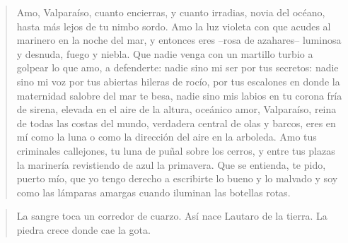 \documentclass[12pt]{article}
\begin{document}
\clearpage
{}
\begin{verse}
Amo, Valparaíso, cuanto encierras,  
y cuanto irradias, novia del océano,  
hasta más lejos de tu nimbo sordo.  
Amo la luz violeta con que acudes  
al marinero en la noche del mar,  
y entonces eres --rosa de azahares--  
luminosa y desnuda, fuego y niebla.  
Que nadie venga con un martillo turbio  
a golpear lo que amo, a defenderte:  
nadie sino mi ser por tus secretos:  
nadie sino mi voz por tus abiertas  
hileras de rocío, por tus escalones  
en donde la maternidad salobre  
del mar te besa, nadie sino mis labios  
en tu corona fría de sirena,  
elevada en el aire de la altura,  
oceánico amor, Valparaíso,  
reina de todas las costas del mundo,  
verdadera central de olas y barcos,  
eres en mí como la luna o como  
la dirección del aire en la arboleda.  
Amo tus criminales callejones,  
tu luna de puñal sobre los cerros,  
y entre tus plazas la marinería  
revistiendo de azul la primavera.  
Que se entienda, te pido, puerto mío,  
que yo tengo derecho  
a escribirte lo bueno y lo malvado  
y soy como las lámparas amargas  
cuando iluminan las botellas rotas.  

\end{verse}

\clearpage
{}
\begin{verse}
La sangre toca un corredor de cuarzo.  
Así nace Lautaro de la tierra.  
La piedra crece donde cae la gota.  

\end{verse}
\end{document}
